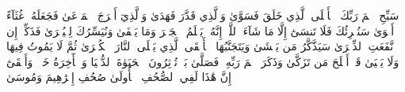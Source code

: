 سَبِّحِ ٱسۡمَ رَبِّكَ ٱلۡأَعۡلَى
ٱلَّذِي خَلَقَ فَسَوَّىٰ
وَٱلَّذِي قَدَّرَ فَهَدَىٰ
وَٱلَّذِيٓ أَخۡرَجَ ٱلۡمَرۡعَىٰ
فَجَعَلَهُۥ غُثَآءً أَحۡوَىٰ
سَنُقۡرِئُكَ فَلَا تَنسَىٰٓ
إِلَّا مَا شَآءَ ٱللَّهُۚ إِنَّهُۥ يَعۡلَمُ ٱلۡجَهۡرَ وَمَا يَخۡفَىٰ
وَنُيَسِّرُكَ لِلۡيُسۡرَىٰ
فَذَكِّرۡ إِن نَّفَعَتِ ٱلذِّكۡرَىٰ
سَيَذَّكَّرُ مَن يَخۡشَىٰ
وَيَتَجَنَّبُهَا ٱلۡأَشۡقَى
ٱلَّذِي يَصۡلَى ٱلنَّارَ ٱلۡكُبۡرَىٰ
ثُمَّ لَا يَمُوتُ فِيهَا وَلَا يَحۡيَىٰ
قَدۡ أَفۡلَحَ مَن تَزَكَّىٰ
وَذَكَرَ ٱسۡمَ رَبِّهِۦ فَصَلَّىٰ
بَلۡ تُؤۡثِرُونَ ٱلۡحَيَوٰةَ ٱلدُّنۡيَا
وَٱلۡأٓخِرَةُ خَيۡرٞ وَأَبۡقَىٰٓ
إِنَّ هَٰذَا لَفِي ٱلصُّحُفِ ٱلۡأُولَىٰ
صُحُفِ إِبۡرَٰهِيمَ وَمُوسَىٰ